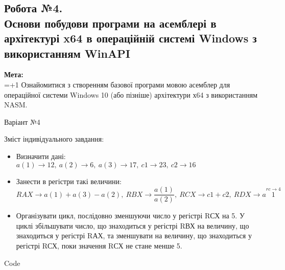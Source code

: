 \documentclass[a4paper,12pt]{article}
\begin{document}
\newpage
    \begin{center}
        \section*{\bfseries{Робота №4.\\
        Основи побудови програми на асемблері в архітектурі x64 в операційній
        системі Windows з використанням WinAPI
    }}
    \end{center}
    \textbf{Мета:} \\
    \hangindent=1.5cm 
    \hangafter=+1 \noindent
    Ознайомитися з створенням базової програми мовою асемблер для
    операційної системи Windows 10 (або пізніше) архітектури х64 з використанням
    NASM. \\
    \begin{center}
        \Large{Варіант №4}
    \end{center}
    Зміст індивідуального завдання:
    \begin{itemize}
        \item Визначити дані: \\
        $a(1) \rightarrow 12,\: 
        a(2) \rightarrow 6,\: 
        a(3) \rightarrow 17,\: 
        c1 \rightarrow 23,\: 
        c2 \rightarrow 16$
        \item Занести в регістри такі величини: \\
        $RAX \rightarrow a(1) + a(3) - a(2),\:
        RBX \rightarrow \dfrac{a(1)}{a(2)},\:
        RCX \rightarrow c1+c2,\:
        RDX \rightarrow a\stackrel{rc\rightarrow 4}{1}$
        \item Організувати цикл, послідовно зменшуючи число у регістрі RСХ на 5. У
        циклі збільшувати число, що знаходиться у регістрі RВХ на величину, що
        знаходиться у регістрі RАХ, та зменшувати на величину, що знаходиться у
        регістрі RСХ, поки значення RСХ не стане менше 5.
    \end{itemize}

\newpage
    \begin{center}
        \Large{Code}
    \end{center}
    \begin{lstlisting}[language=assembler]
    \end{lstlisting}
\end{document}
